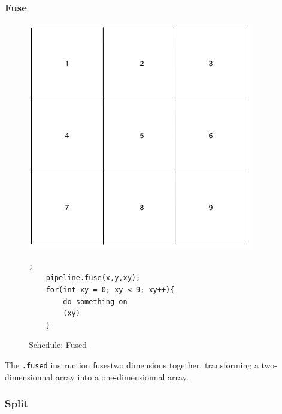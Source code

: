 	\subsubsection{Fuse}


\begin{figure}[H]

		\begin{minipage}[c]{\EIW}
			\centering
		\includegraphics[width=\textwidth]{Images/BaseOrder.png}
		\end{minipage}
		\begin{minipage}[c]{\ECW}
			\centering
\begin{lstlisting}[label={code:reorder}];
    pipeline.fuse(x,y,xy);
	for(int xy = 0; xy < 9; xy++){
		do something on
		(xy)
	}
\end{lstlisting}
		\end{minipage}
		\caption{Schedule: Fused}
		\label{schedule:fuse}
\end{figure}

	The \verb|.fused| instruction  fusestwo dimensions together, transforming a two-dimensionnal array into a one-dimensionnal array. 


\subsubsection{Split}

